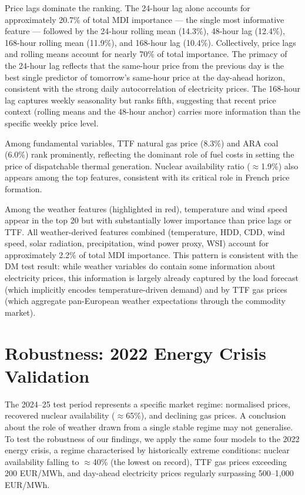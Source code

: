 Price lags dominate the ranking. The 24-hour lag alone accounts for
approximately 20.7\% of total MDI importance — the single most informative
feature — followed by the 24-hour rolling mean (14.3\%), 48-hour lag (12.4\%),
168-hour rolling mean (11.9\%), and 168-hour lag (10.4\%). Collectively, price
lags and rolling means account for nearly 70\% of total importance. The primacy
of the 24-hour lag reflects that the same-hour price from the previous day is
the best single predictor of tomorrow's same-hour price at the day-ahead
horizon, consistent with the strong daily autocorrelation of electricity prices.
The 168-hour lag captures weekly seasonality but ranks fifth, suggesting that
recent price context (rolling means and the 48-hour anchor) carries more
information than the specific weekly price level.

Among fundamental variables, TTF natural gas price (8.3\%) and ARA coal
(6.0\%) rank prominently, reflecting the dominant role of fuel costs in
setting the price of dispatchable thermal generation. Nuclear availability
ratio ($\approx$1.9\%) also appears among the top features, consistent with
its critical role in French price formation.

Among the weather features (highlighted in red), temperature and wind speed
appear in the top 20 but with substantially lower importance than price lags
or TTF. All weather-derived features combined (temperature, HDD, CDD, wind
speed, solar radiation, precipitation, wind power proxy, WSI) account for
approximately 2.2\% of total MDI importance. This pattern is consistent with
the DM test result: while weather variables do contain some information about
electricity prices, this information is largely already captured by the load
forecast (which implicitly encodes temperature-driven demand) and by TTF gas
prices (which aggregate pan-European weather expectations through the commodity
market).

\section{Robustness: 2022 Energy Crisis Validation}
\label{sec:validation2022}

The 2024--25 test period represents a specific market regime: normalised prices,
recovered nuclear availability ($\approx$65\%), and declining gas prices. A
conclusion about the role of weather drawn from a single stable regime may not
generalise. To test the robustness of our findings, we apply the same four
models to the 2022 energy crisis, a regime characterised by historically
extreme conditions: nuclear availability falling to $\approx$40\% (the lowest
on record), TTF gas prices exceeding 200 EUR/MWh, and day-ahead electricity
prices regularly surpassing 500--1{,}000 EUR/MWh.

